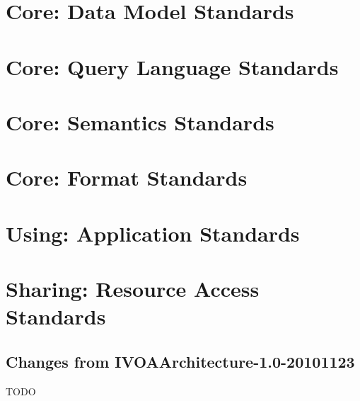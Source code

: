 \documentclass[11pt,a4paper]{ivoa}
\begin{document}
\section{Core: Data Model Standards}

\section{Core: Query Language Standards}

\section{Core: Semantics Standards}

\section{Core: Format Standards}

\section{Using: Application Standards}

\section{Sharing: Resource Access Standards}

\subsection{Changes from IVOAArchitecture-1.0-20101123}

TODO


\end{document}
